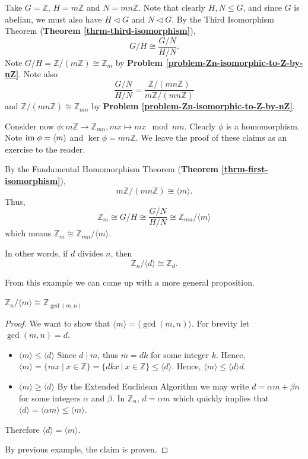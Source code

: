 \begin{example}
    Take $G = \mathbb{Z}$, $H = m\mathbb{Z}$ and $N = mn\mathbb{Z}$. Note that clearly $H, N \leq G$, and since $G$ is abelian, we must also have $H \lhd G$ and $N \lhd G$. By the Third Isomorphism Theorem (\textbf{Theorem \ref{thrm-third-isomorphism}}),
    \[
        G/H \cong \frac{G/N}{H/N}.
    \]
    Note $G/H = \mathbb{Z}/(m\mathbb{Z}) \cong \mathbb{Z}_m$ by \textbf{Problem \ref{problem-Zn-isomorphic-to-Z-by-nZ}}. Note also
    \[
        \frac{G/N}{H/N} = \frac{\mathbb{Z}/(mn\mathbb{Z})}{m\mathbb{Z}/(mn\mathbb{Z})}
    \]
    and $\mathbb{Z}/(mn\mathbb{Z}) \cong \mathbb{Z}_{mn}$ by \textbf{Problem \ref{problem-Zn-isomorphic-to-Z-by-nZ}}.

    Consider now $\phi: m\mathbb{Z} \to \mathbb{Z}_{mn}, mx \mapsto mx \mod mn$. Clearly $\phi$ is a homomorphism. Note $\mathrm{im}\; \phi = \langle m \rangle$ and $\ker \phi = mn\mathbb{Z}$. We leave the proof of these claims as an exercise to the reader.

    By the Fundamental Homomorphism Theorem (\textbf{Theorem \ref{thrm-first-isomorphism}}),
    \[
        m\mathbb{Z} / (mn\mathbb{Z}) \cong \langle m \rangle.
    \]
    Thus,
    \[
        \mathbb{Z}_m \cong G/H \cong \frac{G/N}{H/N} \cong \mathbb{Z}_{mn}/\langle m \rangle
    \]
    which means $\mathbb{Z}_m \cong \mathbb{Z}_{mn} / \langle m \rangle$.

    In other words, if $d$ divides $n$, then
    \[
        \mathbb{Z}_n / \langle d \rangle \cong \mathbb{Z}_d.
    \]
\end{example}

From this example we can come up with a more general proposition.
\begin{proposition}\label{prop-Zn-mod-cyclic-subgroup-of-m}
    $\mathbb{Z}_n / \langle m \rangle \cong \mathbb{Z}_{\gcd(m,n)}$
\end{proposition}
\begin{proof}
    We want to show that $\langle m \rangle = \langle \gcd(m,n) \rangle$. For brevity let $\gcd(m,n) = d$.

    \begin{itemize}
        \item $\boxed{\langle m \rangle \leq \langle d \rangle}$ Since $d\;|\;m$, thus $m = dk$ for some integer $k$. Hence, $\langle m \rangle = \{mx \ | \ x \in \mathbb{Z}\} = \{dkx \ | \ x \in \mathbb{Z}\} \leq \langle d \rangle$. Hence, $\langle m \rangle \leq \langle d \rangle d$.
        \item $\boxed{\langle m \rangle \geq \langle d \rangle}$ By the Extended Euclidean Algorithm we may write $d = \alpha m + \beta n$ for some integers $\alpha$ and $\beta$. In $\mathbb{Z}_n$, $d = \alpha m$ which quickly implies that $\langle d \rangle = \langle \alpha m \rangle \leq \langle m \rangle$.
    \end{itemize}
    Therefore $\langle d \rangle = \langle m \rangle$.

    By previous example, the claim is proven.
\end{proof}

